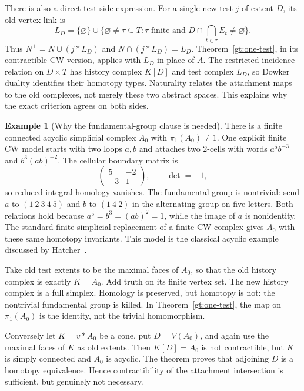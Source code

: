 \documentclass[11pt]{article}
\theoremstyle{definition}
\newtheorem{example}[theorem]{Example}
\begin{document}
There is also a direct test-side expression. For a single new test $j$
of extent $D$, its old-vertex link is
\[
 L_D=\{\varnothing\}\cup
 \{\varnothing\neq\tau\subseteq T:\tau\text{ finite and }
                         D\cap\bigcap_{t\in\tau}E_t\neq\varnothing\}.
\]
Thus $N^+=N\cup(j*L_D)$ and $N\cap(j*L_D)=L_D$.
Theorem~\ref{gt:one-test}, in its contractible-CW version, applies with
$L_D$ in place of $A$. The restricted incidence relation on $D\times T$
has history complex $K[D]$ and test complex $L_D$, so Dowker duality
identifies their homotopy types. Naturality relates the attachment maps
to the old complexes, not merely these two abstract spaces. This explains
why the exact criterion agrees on both sides.

\begin{example}[Why the fundamental-group clause is needed]
There is a finite connected acyclic simplicial complex $A_0$ with
$\pi_1(A_0)\neq1$. One explicit finite CW model starts with two loops
$a,b$ and attaches two $2$-cells with words $a^5b^{-3}$ and
$b^3(ab)^{-2}$. The cellular boundary matrix is
\[
 \begin{pmatrix}5&-2\\-3&1\end{pmatrix},\qquad\det=-1,
\]
so reduced integral homology vanishes. The fundamental group is
nontrivial: send $a$ to $(1\ 2\ 3\ 4\ 5)$ and $b$ to $(1\ 4\ 2)$
in the alternating group on five letters. Both relations hold because
$a^5=b^3=(ab)^2=1$, while the image of $a$ is nonidentity. The standard
finite simplicial replacement of a finite CW complex gives $A_0$ with
these same homotopy invariants. This model is the classical acyclic
example discussed by Hatcher~\cite[Example 2.38 and Theorem 2C.5]{Hatcher}.

Take old test extents to be the maximal faces of $A_0$, so that the
old history complex is exactly $K=A_0$. Add truth on its finite vertex
set. The new history complex is a full simplex. Homology is preserved,
but homotopy is not: the nontrivial fundamental group is killed. In
Theorem~\ref{gt:one-test}, the map on $\pi_1(A_0)$ is the identity,
not the trivial homomorphism.

Conversely let $K=v*A_0$ be a cone, put $D=V(A_0)$, and again use the
maximal faces of $K$ as old extents. Then $K[D]=A_0$ is not contractible,
but $K$ is simply connected and $A_0$ is acyclic. The theorem proves
that adjoining $D$ is a homotopy equivalence. Hence contractibility of
the attachment intersection is sufficient, but genuinely not necessary.
\end{example}
\end{document}
